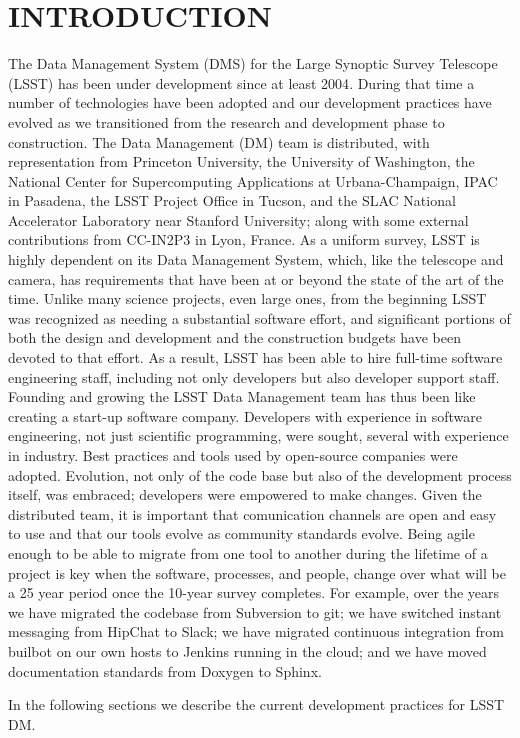 \section{INTRODUCTION}

The Data Management System (DMS)\cite{2015arXiv151207914J} for the Large Synoptic Survey Telescope (LSST) \cite{2008arXiv0805.2366I} has been under development since at least 2004\cite{2004AAS...20510811A}.
During that time a number of technologies have been adopted and our development practices have evolved as we transitioned from the research and development phase to construction.
The Data Management (DM) team is distributed, with representation from Princeton University, the University of Washington, the National Center for Supercomputing Applications at Urbana-Champaign, IPAC in Pasadena, the LSST Project Office in Tucson, and the SLAC National Accelerator Laboratory near Stanford University; along with some external contributions from CC-IN2P3 in Lyon, France.
As a uniform survey, LSST is highly dependent on its Data Management System, which, like the telescope and camera, has requirements that have been at or beyond the state of the art of the time.
Unlike many science projects, even large ones, from the beginning LSST was recognized as needing a substantial software effort, and significant portions of both the design and development and the construction budgets have been devoted to that effort.
As a result, LSST has been able to hire full-time software engineering staff, including not only developers but also developer support staff.
Founding and growing the LSST Data Management team has thus been like creating a start-up software company.
Developers with experience in software engineering, not just scientific programming, were sought, several with experience in industry.
Best practices and tools used by open-source companies were adopted.
Evolution, not only of the code base but also of the development process itself, was embraced; developers were empowered to make changes.
Given the distributed team, it is important that comunication channels are open and easy to use and that our tools evolve as community standards evolve.
Being agile enough to be able to migrate from one tool to another during the lifetime of a project is key when the software, processes, and people, change over what will be a 25 year period once the 10-year survey completes.
For example, over the years we have migrated the codebase from Subversion to git; we have switched instant messaging from HipChat to Slack; we have migrated continuous integration from builbot on our own hosts to Jenkins running in the cloud; and we have moved documentation standards from Doxygen to Sphinx.

In the following sections we describe the current development practices for LSST DM.
